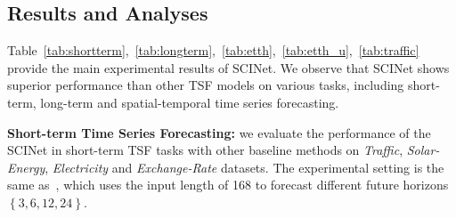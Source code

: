 \documentclass{article}
\begin{document}
\subsection{Results and Analyses}
\label{sec:comparison_sota}
Table~\ref{tab:shortterm},~\ref{tab:longterm},~\ref{tab:etth},~\ref{tab:etth_u},~\ref{tab:traffic} provide the main experimental results of SCINet. We observe that SCINet shows superior performance than other TSF models on various tasks, including short-term, long-term and spatial-temporal time series forecasting.

\vspace{5pt}
\textbf{Short-term Time Series Forecasting:} 
we evaluate the performance of the SCINet in short-term TSF tasks with other baseline methods on \emph{Traffic}, \emph{Solar-Energy}, \emph{Electricity} and \emph{Exchange-Rate} datasets. The experimental setting is the same as~\citep{Lai2018ModelingLA}, which uses the input length of 168 to forecast different future horizons$ \left \{3, 6, 12, 24  \right \}$. 
\end{document}
